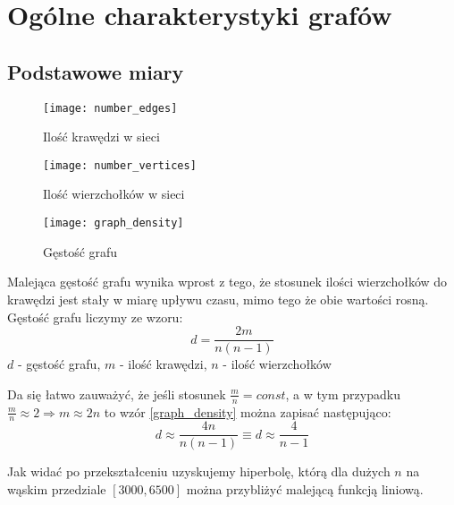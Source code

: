 \newpage
\FloatBarrier
\section{Ogólne charakterystyki grafów}
\FloatBarrier
\subsection{Podstawowe miary}
\begin{figure}[h]
	\centering
	\texttt{[image: number\_edges]}
	\caption{Ilość krawędzi w sieci}
\end{figure}
\FloatBarrier
\FloatBarrier
\begin{figure}[h]
	\centering
	\texttt{[image: number\_vertices]}
	\caption{Ilość wierzchołków w sieci}
\end{figure}
\FloatBarrier
\FloatBarrier
\begin{figure}[h]
	\centering
	\texttt{[image: graph\_density]}
	\caption{Gęstość grafu}
\end{figure}
\FloatBarrier
Malejąca gęstość grafu wynika wprost z tego, że stosunek ilości wierzchołków do krawędzi jest stały w miarę upływu czasu, mimo tego że obie wartości rosną. Gęstość grafu liczymy ze wzoru:
\begin{equation}
\label{graph_density}
d=\frac{2m}{n(n-1)}
\end{equation}
$d$ - gęstość grafu, 
$m$ - ilość krawędzi, 
$n$ - ilość wierzchołków

Da się łatwo zauważyć, że jeśli stosunek $\frac{m}{n} = const$, a w tym przypadku $\frac{m}{n} \approx 2 \Rightarrow m \approx 2n$ to wzór \ref{graph_density} można zapisać następująco:
\begin{equation}
\label{graph_density_simplified}
d \approx \frac{4n}{n(n-1)} \equiv d \approx \frac{4}{n-1}
\end{equation}

Jak widać po przekształceniu uzyskujemy hiperbolę, którą dla dużych $n$ na wąskim przedziale $[3000, 6500]$ można przybliżyć malejącą funkcją liniową.
\FloatBarrier
\newpage